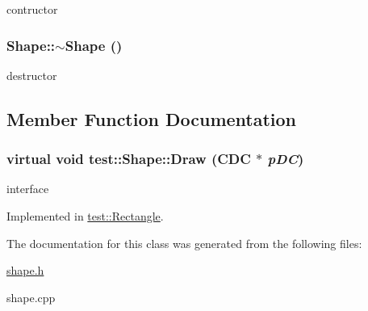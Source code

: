 contructor \hypertarget{classtest_1_1Shape_935afc9e576015f967d90de56977167d}{
\subsubsection[$\sim$Shape]{\setlength{\rightskip}{0pt plus 5cm}Shape::$\sim$Shape ()}}
\label{classtest_1_1Shape_935afc9e576015f967d90de56977167d}


destructor 

\subsection{Member Function Documentation}
\hypertarget{classtest_1_1Shape_71718b8d8832ba737879df3d78b22204}{
\subsubsection[Draw]{\setlength{\rightskip}{0pt plus 5cm}virtual void test::Shape::Draw (CDC $\ast$ {\em pDC})}}
\label{classtest_1_1Shape_71718b8d8832ba737879df3d78b22204}


interface 

Implemented in \hyperlink{classtest_1_1Rectangle_22e5e5f9e3c7474d3586e1d7d36bb069}{test::Rectangle}.

The documentation for this class was generated from the following files:\begin{CompactItemize}
\item 
\hyperlink{shape_8h}{shape.h}\item 
shape.cpp\end{CompactItemize}
